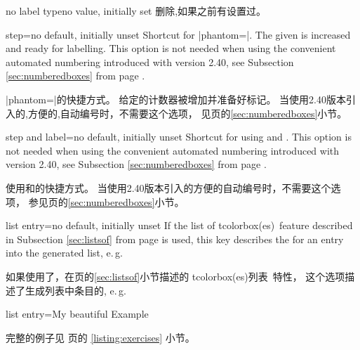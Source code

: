 \begin{docTcbKey}{no label type}{}{no value, initially set}
删除,如果之前有设置过。
\end{docTcbKey}

\begin{docTcbKey}{step}{=}{no default, initially unset}
Shortcut for |phantom={}|. The given  is
increased and ready for labelling. This option is not needed when
using the convenient automated numbering introduced with version 2.40,
see Subsection \ref{sec:numberedboxes}
from page \pageref{sec:numberedboxes}.

|phantom={}|的快捷方式。%
给定的计数器被增加并准备好标记。%
当使用2.40版本引入的,方便的,自动编号时，不需要这个选项，%
见\pageref{sec:numberedboxes}页的\ref{sec:numberedboxes}小节。
\end{docTcbKey}



\begin{docTcbKey}{step and label}{=}{no default, initially unset}
Shortcut for using  and . This option is not needed when
using the convenient automated numbering introduced with version 2.40,
see Subsection \ref{sec:numberedboxes}
from page \pageref{sec:numberedboxes}.

使用和的快捷方式。%
当使用2.40版本引入的方便的自动编号时，不需要这个选项，%
参见\pageref{sec:numberedboxes}页的\ref{sec:numberedboxes}小节。
\end{docTcbKey}


\begin{docTcbKey}{list entry}{=}{no default, initially unset}
If the \flqq list of tcolorbox(es)\frqq\ feature described in Subsection
\ref{sec:listsof} from page \pageref{sec:listsof} is used, this key
describes the  for an entry into the generated list, e.\,g.

如果使用了，在\pageref{sec:listsof}页的\ref{sec:listsof}小节描述的 \flqq tcolorbox(es)列表\frqq\ 特性， 
这个选项描述了生成列表中条目的, e.\,g.
\begin{dispListing}
list entry={\protect\numberline{\thetcbcounter}My beautiful Example}
\end{dispListing}
完整的例子见 \pageref{listing:exercises} 页的 \ref{listing:exercises} 小节。
\end{docTcbKey}


